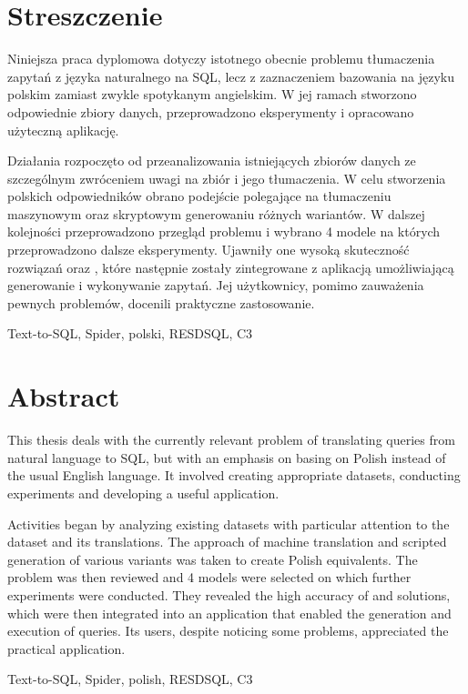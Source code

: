 \section*{Streszczenie}
\vspace{1cm}

Niniejsza praca dyplomowa dotyczy istotnego obecnie problemu tłumaczenia zapytań z języka naturalnego na SQL, lecz z zaznaczeniem bazowania na języku polskim zamiast zwykle spotykanym angielskim. W jej ramach stworzono odpowiednie zbiory danych, przeprowadzono eksperymenty i opracowano użyteczną aplikację.

Działania rozpoczęto od przeanalizowania istniejących zbiorów danych ze szczególnym zwróceniem uwagi na zbiór  i jego tłumaczenia. W celu stworzenia polskich odpowiedników obrano podejście polegające na tłumaczeniu maszynowym oraz skryptowym generowaniu różnych wariantów. W dalszej kolejności przeprowadzono przegląd problemu  i wybrano 4 modele na których przeprowadzono dalsze eksperymenty. Ujawniły one wysoką skuteczność rozwiązań  oraz , które następnie zostały zintegrowane z aplikacją umożliwiającą generowanie i wykonywanie zapytań. Jej użytkownicy, pomimo zauważenia pewnych problemów, docenili praktyczne zastosowanie.

\vspace{1cm}
Text-to-SQL, Spider, polski, RESDSQL, C3
\clearpage

\section*{Abstract}
\vspace{1cm}

This thesis deals with the currently relevant problem of translating queries from natural language to SQL, but with an emphasis on basing on Polish instead of the usual English language. It involved creating appropriate datasets, conducting experiments and developing a useful application.

Activities began by analyzing existing datasets with particular attention to the  dataset and its translations. The approach of machine translation and scripted generation of various variants was taken to create Polish equivalents. The  problem was then reviewed and 4 models were selected on which further experiments were conducted. They revealed the high accuracy of  and  solutions, which were then integrated into an application that enabled the generation and execution of queries. Its users, despite noticing some problems, appreciated the practical application.

\vspace{1cm}
Text-to-SQL, Spider, polish, RESDSQL, C3
\clearpage
